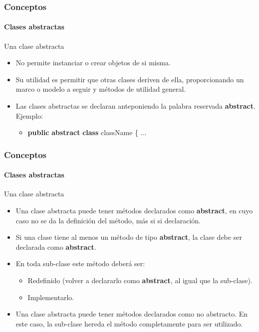 \documentclass{beamer}
\begin{document}
		\begin{frame}
			\frametitle{Conceptos}
			\framesubtitle{Clases abstractas}

			\begin{block}{Una clase abstracta}
				\begin{itemize}
  					\item No permite instanciar o crear objetos de si misma.
					\item Su utilidad es permitir que otras clases deriven de ella, proporcionando un marco o modelo a seguir y m\'etodos de utilidad general.
					\item Las clases abstractas se declaran anteponiendo la palabra reservada \textbf{abstract}. Ejemplo:
					\begin{itemize}
  						\item \textbf{public} \textbf{abstract} \textbf{class} className \{ ...
					\end{itemize}
				\end{itemize}
			\end{block}
		\end{frame}

		\begin{frame}
			\frametitle{Conceptos}
			\framesubtitle{Clases abstractas}

			\begin{block}{Una clase abstracta}
				\begin{itemize}
  					\item Una clase abstracta puede tener m\'etodos declarados como \textbf{abstract}, en cuyo caso no se da la definici\'on del m\'etodo, m\'as si si declaraci\'on.
					\item Si una clase tiene al menos un m\'etodo de tipo \textbf{abstract}, la clase debe ser declarada como \textbf{abstract}.
					\item En toda sub-clase este m\'etodo deber\'a ser:
					\begin{itemize}
  						\item Redefinido (volver a declararlo como \textbf{abstract}, al igual que la sub-clase).
						\item Implementarlo.
					\end{itemize}
					\item Una clase abstracta puede tener m\'etodos declarados como no abstracto. En este caso, la sub-clase hereda el m\'etodo completamente para ser utilizado.
				\end{itemize}
			\end{block}
		\end{frame}
\end{document}
